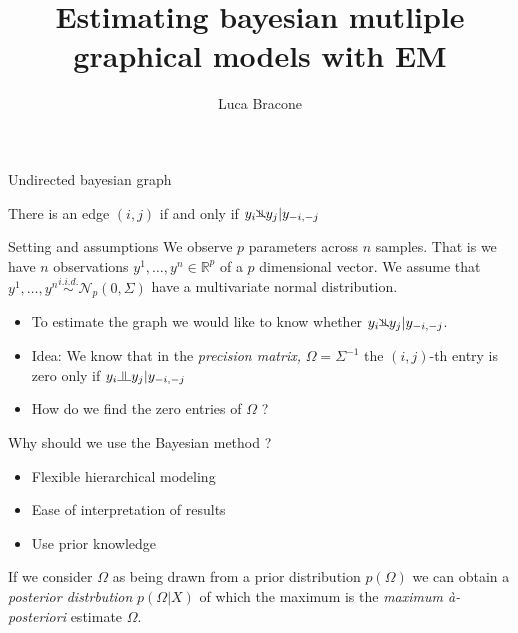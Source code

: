 \documentclass{beamer}
\title{Estimating bayesian mutliple graphical models with EM}
\author{Luca Bracone}
\newcommand{\indep}{\raisebox{0.05em}{\rotatebox[origin=c]{90}{$\models$}}}
\newcommand{\nindep}{{\rotatebox[origin=c]{90}{$\nvDash$}}}
\begin{document}
\begin{frame}
	\titlepage
\end{frame}

\begin{frame}{Undirected bayesian graph}
	\begin{center}
	\end{center}
	There is an edge $(i,j)$ if and only if $y_i \nindep y_j | y_{-i, -j}$
\end{frame}
\begin{frame}{Setting and assumptions}
	We observe $p$ parameters across $n$ samples. That is we have
	$n$ observations $y^1, \dots, y^n \in \mathbb{R}^p$ of a $p$ dimensional
	vector. We assume that $y^1, \dots, y^n \stackrel{i.i.d.}{\sim}
		\mathcal{N}_p(0, \Sigma)$ have a multivariate normal distribution.
	\begin{itemize}
		\item To estimate the graph we would like to know whether $y_i \nindep
			      y_j | y_{-i,-j}$.
		\item Idea: We know that in the \emph{precision matrix,} $\Omega =
			      \Sigma^{-1}$ the $(i,j)$-th entry is zero only if $y_i \indep y_j |
			      y_{-i, -j}$
		\item How do we find the zero entries of $\Omega$ ?
	\end{itemize}
\end{frame}
\begin{frame}{Why should we use the Bayesian method ?}
	\begin{itemize}
		\item Flexible hierarchical modeling
		\item Ease of interpretation of results
		\item Use prior knowledge
	\end{itemize}
	If we consider $\Omega$ as being drawn from a prior distribution
	$p(\Omega)$ we can obtain a \emph{posterior distrbution} $p(\Omega | X)$
	of which the maximum is the \emph{maximum à-posteriori} estimate
	$\Omega$.
\end{frame}
\end{document}
